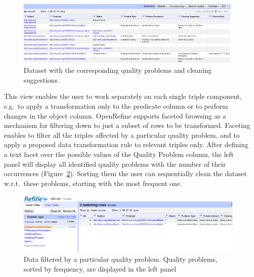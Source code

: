 \begin{figure}[ht!]
\centering
\includegraphics[width=\textwidth]{figures/spreadsheet.png}
\caption{Dataset with the corresponding quality problems and cleaning suggestions.}
\label{fig:spreadsheet}
\end{figure}
This view enables the user to work separately on each single triple component, e.g.\ to apply a transformation only to the predicate column or to perform changes in the object column.
OpenRefine supports faceted browsing as a mechanism for filtering down to just a subset of rows to be transformed.
Faceting enables to filter all the triples affected by a particular quality problem, and to apply a proposed data transformation rule to relevant triples only.
After defining a text facet over the possible values of the Quality Problem column, the left panel will display all identified quality problems with the number of their occurrences (Figure~\ref{fig:facets}).
Sorting them the user can sequentially clean the dataset w.r.t.\ these problems, starting with the most frequent one. 

\begin{figure}[ht!]
\centering
\includegraphics[width=.99\textwidth]{figures/statistics.png}
\caption{Data filtered by a particular quality problem. Quality problems, sorted by frequency, are displayed  in the left panel}
\label{fig:facets}
\end{figure}

